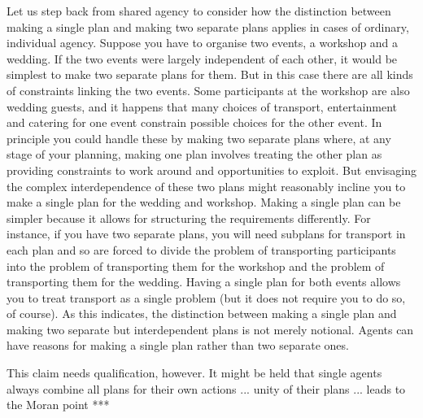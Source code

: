 \documentclass[12pt,\papersize]{extarticle}
\begin{document}
Let us step back from shared agency  
 to consider how 
 the distinction between making a single plan and making two separate plans
  applies in cases of ordinary, individual agency.
Suppose you have to organise two events, a workshop and a wedding.
If the two events were largely independent of each other,
it would be simplest to make two separate plans for them.
But in this case there are all kinds of constraints linking the two events.
Some participants at the workshop are also wedding guests,
and it happens that many choices of transport, entertainment and catering for one event constrain possible choices for the other event.
In principle you could handle these by making two separate plans where, at any stage of your planning, making one plan involves treating the other plan as providing constraints to work around and opportunities to exploit.
But envisaging the complex interdependence of these two plans  
might reasonably incline you to make a single plan for the wedding and workshop.
Making a single plan can be simpler because it allows for structuring the requirements differently.
For instance, if you have two separate plans, you will need subplans for transport in each plan and so are forced to divide the problem of transporting participants into the problem of transporting them for the workshop and the problem of transporting them for the wedding.
Having a single plan for both events allows you to treat transport as a single problem (but it does not require you to do so, of course).
As this indicates, the distinction between making a single plan and making two separate but interdependent plans is not merely notional.
Agents can have reasons for making a single plan rather than two separate ones.

This claim needs qualification, however.
It might be held that single agents always combine all plans for their own actions ... unity of their plans ... leads to the Moran point ***

 
 
\end{document}
